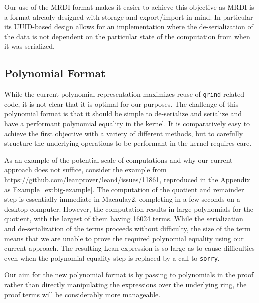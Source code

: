 \documentclass[runningheads]{llncs}
\begin{document}
Our use of the MRDI format makes it easier to achieve this objective as MRDI is a format already designed with storage and export/import in mind. In particular its UUID-based design allows for an implementation where the de-serialization of the data is not dependent on the particular state of the computation from when it was serialized.

\subsection*{Polynomial Format}

While the current polynomial representation maximizes reuse of \texttt{grind}-related code, it is not clear that it is optimal for our purposes. The challenge of this polynomial format is that it should be simple to de-serialize and serialize and have a performant polynomial equality in the kernel. It is comparatively easy to achieve the first objective with a variety of different methods, but to carefully structure the underlying operations to be performant in the kernel requires care.

As an example of the potential scale of computations and why our current approach does not suffice, consider the example from \url{https://github.com/leanprover/lean4/issues/11861}, reproduced in the Appendix as Example~\ref{ex:big-example}. The computation of the quotient and remainder step is essentially immediate in Macaulay2, completing in a few seconds on a desktop computer. However, the computation results in large polynomials for the quotient, with the largest of them having 16024 terms. While the serialization and de-serialization of the terms proceeds without difficulty, the size of the term means that we are unable to prove the required polynomial equality using our current approach. The resulting Lean expression is so large as to cause difficulties even when the polynomial equality step is replaced by a call to \texttt{sorry}.

Our aim for the new polynomial format is by passing to polynomials in the proof rather than directly manipulating the expressions over the underlying ring, the proof terms will be considerably more manageable.
\end{document}
